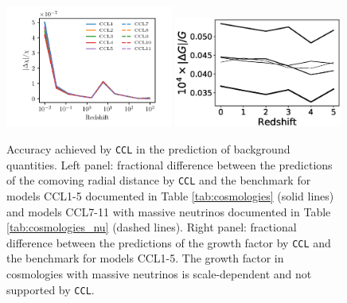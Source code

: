 \documentclass[\docopts]{\docclass}
\newcommand{\ccl}{{\tt CCL}\xspace}
\begin{document}
\begin{figure}
  \centering
  \includegraphics[width=0.49\textwidth]{distances}
  \includegraphics[width=0.49\textwidth]{growth}
  \caption{Accuracy achieved by \ccl in the prediction of background quantities. Left panel: fractional difference between the predictions of the comoving radial distance by \ccl and the benchmark for models CCL1-5 documented in Table \ref{tab:cosmologies} (solid lines) and models CCL7-11 with massive neutrinos documented in Table \ref{tab:cosmologies_nu} (dashed lines). Right panel: fractional difference between the predictions of the growth factor by \ccl and the benchmark for models CCL1-5. The growth factor in cosmologies with massive neutrinos is scale-dependent and not supported by \ccl.}
  \label{fig:distancegrow}
\end{figure}
\end{document}
